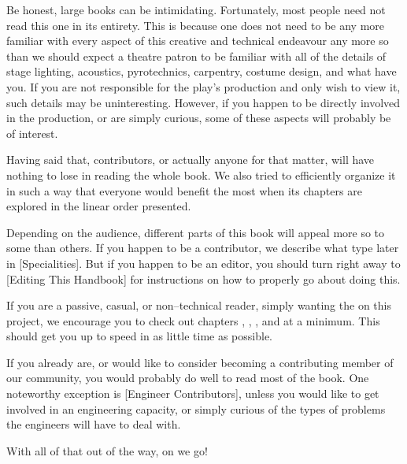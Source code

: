 

Be honest, large books can be intimidating. Fortunately, most people need not read this one in its entirety. This is because one does not need to be any more familiar with every aspect of this creative and technical endeavour any more so than we should expect a theatre patron to be familiar with all of the details of stage lighting, acoustics, pyrotechnics, carpentry, costume design, and what have you. If you are not responsible for the play's production and only wish to view it, such details may be uninteresting. However, if you happen to be directly involved in the production, or are simply curious, some of these aspects will probably be of interest.

Having said that, contributors, or actually anyone for that matter, will have nothing to lose in reading the whole book. We also tried to efficiently organize it in such a way that everyone would benefit the most when its chapters are explored in the linear order presented.

Depending on the audience, different parts of this book will appeal more so to some than others. If you happen to be a contributor, we describe what type later in [Specialities]. But if you happen to be an editor, you should turn right away to [Editing This Handbook] for instructions on how to properly go about doing this.

If you are a passive, casual, or non--technical reader, simply wanting the  on this project, we encourage you to check out chapters \in[Leitmotifs], , , and \in[Timeline] at a minimum. This should get you up to speed in as little time as possible.

If you already are, or would like to consider becoming a contributing member of our community, you would probably do well to read most of the book. One noteworthy exception is [Engineer Contributors], unless you would like to get involved in an engineering capacity, or simply curious of the types of problems the engineers will have to deal with.

With all of that out of the way, on we go!

\StopChapter

